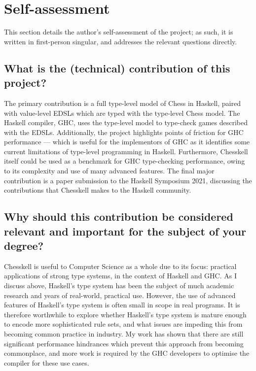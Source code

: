 \section{Self-assessment}

This section details the author's self-assessment of the project; as such, it is written in first-person singular, and addresses the relevant questions directly.

\subsection{What is the (technical) contribution of this project?}

The primary contribution is a full type-level model of Chess in Haskell, paired with value-level EDSLs which are typed with the type-level Chess model. The Haskell compiler, GHC, uses the type-level model to type-check games described with the EDSLs. Additionally, the project highlights points of friction for GHC performance --- which is useful for the implementors of GHC as it identifies some current limitations of type-level programming in Haskell. Furthermore, Chesskell itself could be used as a benchmark for GHC type-checking performance, owing to its complexity and use of many advanced features. The final major contribution is a paper submission to the Haskell Symposium 2021, discussing the contributions that Chesskell makes to the Haskell community.

\subsection{Why should this contribution be considered relevant and important for the subject of your degree?}

Chesskell is useful to Computer Science as a whole due to its focus: practical applications of strong type systems, in the context of Haskell and GHC. As I discuss above, Haskell's type system has been the subject of much academic research and years of real-world, practical use. However, the use of advanced features of Haskell's type system is often small in scope in real programs. It is therefore worthwhile to explore whether Haskell's type system is mature enough to encode more sophisticated rule sets, and what issues are impeding this from becoming common practice in industry. My work has shown that there are still significant performance hindrances which prevent this approach from becoming commonplace, and more work is required by the GHC developers to optimise the compiler for these use cases.


